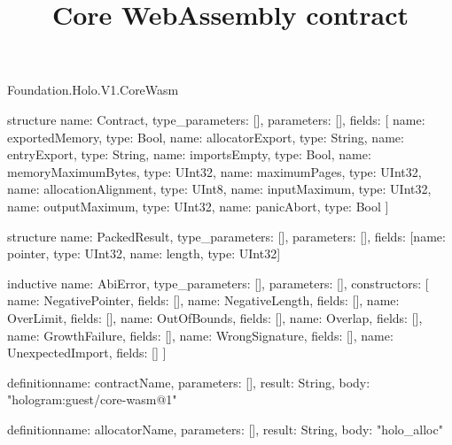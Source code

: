 \begin{lexlean}{Foundation.Holo.V1.CoreWasm}
\title{Core WebAssembly contract}
\begin{semanticmodule}
structure{
  name: Contract,
  type_parameters: [],
  parameters: [],
  fields: [
    {name: exportedMemory, type: Bool},
    {name: allocatorExport, type: String},
    {name: entryExport, type: String},
    {name: importsEmpty, type: Bool},
    {name: memoryMaximumBytes, type: UInt32},
    {name: maximumPages, type: UInt32},
    {name: allocationAlignment, type: UInt8},
    {name: inputMaximum, type: UInt32},
    {name: outputMaximum, type: UInt32},
    {name: panicAbort, type: Bool}
  ]
}

structure{
  name: PackedResult,
  type_parameters: [],
  parameters: [],
  fields: [{name: pointer, type: UInt32}, {name: length, type: UInt32}]
}

inductive{
  name: AbiError,
  type_parameters: [],
  parameters: [],
  constructors: [
    {name: NegativePointer, fields: []},
    {name: NegativeLength, fields: []},
    {name: OverLimit, fields: []},
    {name: OutOfBounds, fields: []},
    {name: Overlap, fields: []},
    {name: GrowthFailure, fields: []},
    {name: WrongSignature, fields: []},
    {name: UnexpectedImport, fields: []}
  ]
}

definition{name: contractName, parameters: [], result: String, body: "hologram:guest/core-wasm@1"}

definition{name: allocatorName, parameters: [], result: String, body: "holo_alloc"}
\end{semanticmodule}
\end{lexlean}
